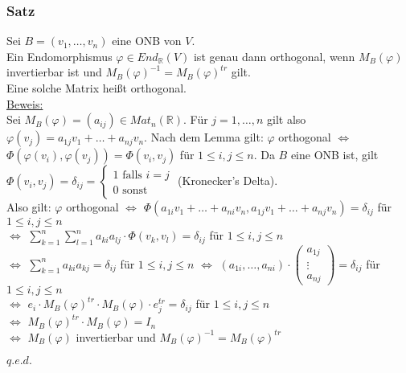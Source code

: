 \documentclass[a4paper]{article}
\newcommand{\ul}{\underline}
\renewcommand{\proof}{\ul{Beweis:}\\}
\renewcommand{\qed}{\begin{flushright}
\ul{\(q.e.d.\)}
\end{flushright}}
\let\phi\varphi
\begin{document}
\subsubsection{Satz}
Sei \(B=(v_1,\dots,v_n)\) eine ONB von \(V\).\\
Ein Endomorphismus \(\phi\in End_\mathbb{R}(V)\) ist genau dann orthogonal, wenn \(M_B(\phi)\) invertierbar ist und \(M_B(\phi)^{-1}=M_B(\phi)^{tr}\) gilt.\\
Eine solche Matrix heißt orthogonal.\\
\proof
Sei \(M_B(\phi)=(a_{ij})\in Mat_n(\mathbb{R})\). Für \(j=1,\dots,n\) gilt also \(\phi(v_j)=a_{1j}v_1+\dots+a_{nj}v_n\). Nach dem Lemma gilt: \(\phi\) orthogonal \(\Leftrightarrow\) \(\Phi(\phi(v_i),\phi(v_j))=\Phi(v_i,v_j)\) für \(1\leq i,j\leq n\). Da \(B\) eine ONB ist, gilt \(\Phi(v_i,v_j)=\delta_{ij}=\begin{cases}
1\text{ falls } i=j\\
0\text{ sonst}
\end{cases}\) (Kronecker's Delta).\\
Also gilt: \(\phi\) orthogonal \(\Leftrightarrow\) \(\Phi(a_{1i}v_1+\dots+a_{ni}v_n,a_{1j}v_1+\dots+a_{nj}v_n)=\delta_{ij}\) für \(1\leq i,j\leq n\)\\
\(\Leftrightarrow\) \(\sum_{k=1}^n\sum_{l=1}^na_{ki}a_{lj}\cdot\Phi(v_k,v_l)=\delta_{ij}\) für \(1\leq i,j\leq n\)\\
\(\Leftrightarrow\) \(\sum_{k=1}^na_{ki}a_{kj}=\delta_{ij}\) für \(1\leq i,j\leq n\) \(\Leftrightarrow\) \((a_{1i},\dots,a_{ni})\cdot\begin{pmatrix}
a_{1j}\\
\vdots\\
a_{nj}
\end{pmatrix}=\delta_{ij}\) für \(1\leq i,j\leq n\)\\
\(\Leftrightarrow\) \(e_i\cdot M_B(\phi)^{tr}\cdot M_B(\phi)\cdot e_j^{tr}=\delta_{ij}\) für \(1\leq i,j\leq n\)\\
\(\Leftrightarrow\) \(M_B(\phi)^{tr}\cdot M_B(\phi)=I_n\)\\
\(\Leftrightarrow\) \(M_B(\phi)\) invertierbar und \(M_B(\phi)^{-1}=M_B(\phi)^{tr}\)
\qed
\end{document}
